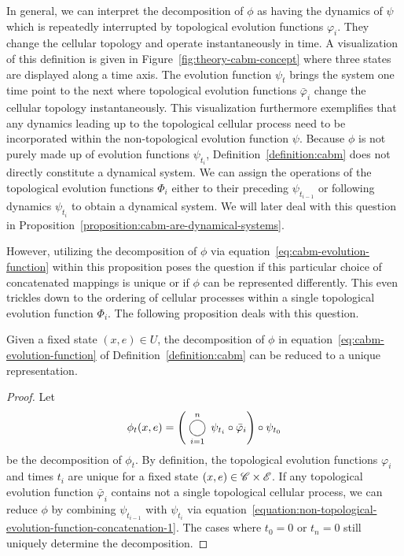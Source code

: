 In general, we can interpret the decomposition of $\phi$ as having the dynamics of $\psi$ which is
repeatedly interrupted by topological evolution functions $\varphi_i$.
They change the cellular topology and operate instantaneously in time.
A visualization of this definition is given in Figure~\ref{fig:theory-cabm-concept} where three
states are displayed along a time axis.
The evolution function $\psi_t$ brings the system one time point to the next where topological
evolution functions $\bar{\varphi}_i$ change the cellular topology instantaneously.
This visualization furthermore exemplifies that any dynamics leading up to the topological cellular
process need to be incorporated within the non-topological evolution function $\psi$.
Because $\phi$ is not purely made up of evolution functions $\psi_{t_i}$,
Definition~\ref{definition:cabm} does not directly constitute a dynamical system.
We can assign the operations of the topological evolution functions $\Phi_i$ either to their
preceding $\psi_{t_{i-1}}$ or following dynamics $\psi_{t_i}$ to obtain a dynamical system.
We will later deal with this question in Proposition~\ref{proposition:cabm-are-dynamical-systems}.

However, utilizing the decomposition of $\phi$ via equation~\ref{eq:cabm-evolution-function} within
this proposition poses the question if this particular choice of concatenated mappings is unique or
if $\phi$ can be represented differently.
This even trickles down to the ordering of cellular processes within a single topological evolution
function $\Phi_i$.
The following proposition deals with this question.

\begin{proposition}
    Given a fixed state $(x,e)\in U$, the decomposition of $\phi$ in
    equation~\eqref{eq:cabm-evolution-function} of Definition~\ref{definition:cabm} can be reduced
    to a unique representation.
    \label{proposition:cabm-time-evolution-is-unique}
\end{proposition}

\begin{proof}
    Let
    \begin{equation}
        \phi_t(x,e) =\left(\bigcomp_{i=1}^n\psi_{t_i}\circ\bar{\varphi}_i\right)\circ\psi_{t_0}
    \end{equation}
    be the decomposition of $\phi_t$.
    By definition, the topological evolution functions $\varphi_i$ and times $t_i$ are unique for a
    fixed state $(x,e)\in\mathscr{C}\times\mathscr{E}$.
    If any topological evolution function $\bar{\varphi}_i$ contains not a single topological
    cellular process, we can reduce $\phi$ by combining $\psi_{t_{i-1}}$ with $\psi_{t_i}$ via
    equation~\eqref{equation:non-topological-evolution-function-concatenation-1}.
    The cases where $t_0=0$ or $t_n=0$ still uniquely determine the decomposition.
\end{proof}

